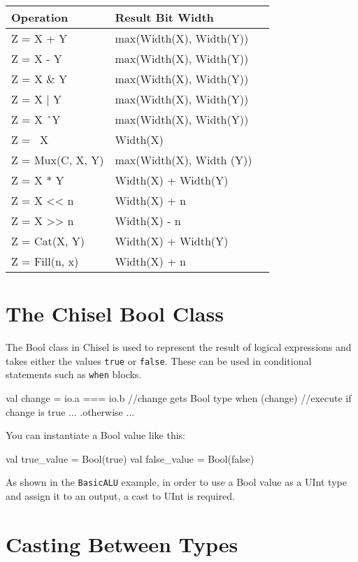 \documentclass[twocolumn, 10pt]{article}
\begin{document}
\begin{center}
	\begin{tabular}{| l | l | l | }
	\hline
	Operation & Result Bit Width \\ \hline
	Z = X + Y & max(Width(X), Width(Y))  \\ \hline
	Z = X - Y & max(Width(X), Width(Y)) \\ \hline
	Z = X \& Y & max(Width(X), Width(Y)) \\ \hline
	Z = X | Y & max(Width(X), Width(Y)) \\ \hline
	Z = X \^\ Y & max(Width(X), Width(Y)) \\ \hline
	Z = ~X & Width(X) \\ \hline
	Z = Mux(C, X, Y) & max(Width(X), Width (Y)) \\ \hline
	Z = X * Y & Width(X) + Width(Y) \\ \hline
	Z = X << n & Width(X) + n \\ \hline
	Z = X >> n & Width(X) - n \\ \hline
	Z = Cat(X, Y) & Width(X) + Width(Y) \\ \hline
	Z = Fill(n, x) & Width(X) + n \\ \hline
	\end{tabular}
\end{center}

\section{The Chisel Bool Class}

The Bool class in Chisel is used to represent the result of logical expressions and takes either the values \verb+true+ or \verb+false+. These can be used in conditional statements such as \verb+when+ blocks.

\begin{scala}
val change = io.a === io.b //change gets Bool type
when (change) { //execute if change is true
	...
} .otherwise {
	...
}
\end{scala}

You can instantiate a Bool value like this:

\begin{scala}
val true_value  = Bool(true)
val false_value = Bool(false)
\end{scala}

As shown in the \verb+BasicALU+ example, in order to use a Bool value as a UInt type and assign it to an output, a cast to UInt is required.

\section{Casting Between Types}
\end{document}
